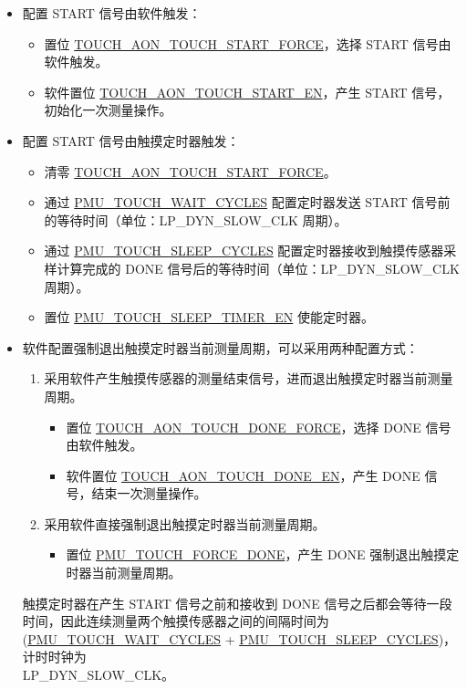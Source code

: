 \documentclass[main\_\_CN.tex]{subfiles}
\begin{document}
\begin{itemize}
    \item 配置 START 信号由软件触发：
    \begin{itemize}
        \item 置位 \hyperref[fielddesc:TOUCHAONTOUCHSTARTFORCE]{TOUCH\_AON\_TOUCH\_START\_FORCE}，选择 START 信号由软件触发。
        \item 软件置位 \hyperref[fielddesc:TOUCHAONTOUCHSTARTEN]{TOUCH\_AON\_TOUCH\_START\_EN}，产生 START 信号，初始化一次测量操作。
    \end{itemize}
    \item 配置 START 信号由触摸定时器触发：
    \begin{itemize}
        \item 清零 \hyperref[fielddesc:TOUCHAONTOUCHSTARTFORCE]{TOUCH\_AON\_TOUCH\_START\_FORCE}。
        \item 通过 \hyperref[fielddesc:PMUTOUCHWAITCYCLES]{PMU\_TOUCH\_WAIT\_CYCLES} 配置定时器发送 START 信号前的等待时间（单位：LP\_DYN\_SLOW\_CLK 周期）。
        \item 通过 \hyperref[fielddesc:PMUTOUCHSLEEPCYCLES]{PMU\_TOUCH\_SLEEP\_CYCLES} 配置定时器接收到触摸传感器采样计算完成的 DONE 信号后的等待时间（单位：LP\_DYN\_SLOW\_CLK 周期）。
        \item 置位 \hyperref[fielddesc:PMUTOUCHSLEEPTIMEREN]{PMU\_TOUCH\_SLEEP\_TIMER\_EN} 使能定时器。
    \end{itemize}
    \item 软件配置强制退出触摸定时器当前测量周期，可以采用两种配置方式：
    \begin{enumerate}
        \item 采用软件产生触摸传感器的测量结束信号，进而退出触摸定时器当前测量周期。
        \begin{itemize}
            \item 置位 \hyperref[fielddesc:TOUCHAONTOUCHDONEFORCE]{TOUCH\_AON\_TOUCH\_DONE\_FORCE}，选择 DONE 信号由软件触发。
            \item 软件置位 \hyperref[fielddesc:TOUCHAONTOUCHDONEEN]{TOUCH\_AON\_TOUCH\_DONE\_EN}，产生 DONE 信号，结束一次测量操作。
        \end{itemize}
        \item 采用软件直接强制退出触摸定时器当前测量周期。
        \begin{itemize}
            \item 置位 \hyperref[fielddesc:PMUTOUCHFORCEDONE]{PMU\_TOUCH\_FORCE\_DONE}，产生 DONE 强制退出触摸定时器当前测量周期。
        \end{itemize}
    \end{enumerate}

\begin{tiplisting}
触摸定时器在产生 START 信号之前和接收到 DONE 信号之后都会等待一段时间，因此连续测量两个触摸传感器之间的间隔时间为 (\hyperref[fielddesc:PMUTOUCHWAITCYCLES]{PMU\_TOUCH\_WAIT\_CYCLES} + \hyperref[fielddesc:PMUTOUCHSLEEPCYCLES]{PMU\_TOUCH\_SLEEP\_CYCLES})，计时时钟为\\ LP\_DYN\_SLOW\_CLK。
\end{tiplisting}
\end{itemize}
\end{document}
